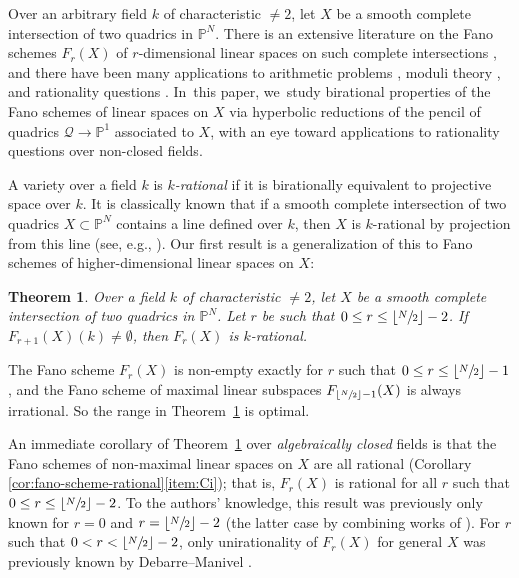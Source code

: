 \documentclass[JEP,XML,SOM,Unicode,NoEqCountersInSection,published]{cedram}
\let\bb\mathbb\let\Bbb\mathbb
\theoremstyle{plain}
\newtheorem{thm}{Theorem}[section]
\theoremstyle{definition}
\newcommand{\defi}[1]{\emph{#1}}
\renewcommand\P{\mathbb{P}}
\begin{document}
Over an arbitrary field $k$ of characteristic $\neq 2$,
let $X$ be a smooth complete intersection of two quadrics in $\P^N$.
There is an extensive literature on
the Fano schemes \(F_r(X)\) of
\(r\)-dimensional linear spaces on such complete intersections
\cite{Gauthier54,Reid-thesis,Tyurin-survey, Donagi80, Wang-maximal-linear-spaces},
and there have been many applications to arithmetic problems \cite{CTSSD, BGW, IP-hyperelliptic, CT-intersection-quadrics}, moduli theory \cite{Desale-Ramanan, Ramanan81}, and rationality questions \cite{ABB14,HT-intersection-quadrics,BW-IJ}. In~this paper, we~study birational properties of
the Fano schemes of linear spaces on $X$ via
hyperbolic reductions of the pencil of quadrics $\mathcal{Q}\to \P^1$ associated to \(X\), with an eye toward applications to rationality questions over non-closed fields.

A variety over a field \(k\) is \defi{\(k\)-rational} if it is birationally equivalent to projective space over \(k\).
It is classically known that if a smooth complete intersection of two quadrics \(X \subset \bb P^N\) contains a line defined over $k$, then $X$ is $k$\nobreakdash-rational by projection from this line (see, e.g., \cite[Prop.\,2.2]{CTSSD}).
Our first result is a generalization of this to Fano schemes of higher-dimensional linear spaces on \(X\):
\begin{thm}\label{Fanoscheme}
Over a field $k$ of characteristic $\neq 2$,
let $X$ be a smooth complete intersection of two quadrics in $\P^N$.
Let $r$ be such that $0\leq r\leq \lfloor \sfrac{N}{2}\rfloor -2$. If~$F_{r+1}(X)(k)\neq \emptyset$,
then $F_r(X)$ is $k$\nobreakdash-rational.
\end{thm}

The Fano scheme \(F_r(X)\) is non-empty exactly for $r$ such that $0\leq r\leq \lfloor \sfrac{N}{2}\rfloor -1$, and the Fano scheme of maximal linear subspaces \(F_{\lfloor \sfrac{N}{2}\rfloor - 1}(X)\) is always irrational. So the range in Theorem~\ref{Fanoscheme} is optimal.

An immediate corollary of Theorem~\ref{Fanoscheme} over \emph{algebraically closed} fields is that the Fano schemes of non-maximal linear spaces on $X$ are all rational (Corollary \ref{cor:fano-scheme-rational}\eqref{item:Ci}); that is, \(F_r(X)\) is rational for all $r$ such that $0\leq r\leq \lfloor \sfrac{N}{2}\rfloor -2$.
To the authors' knowledge, this result was previously only known for \(r=0\) and \(r = \lfloor\sfrac{N}{2}\rfloor-2\) (the latter case by combining works of \cite{Desale-Ramanan,Newstead75,Newstead80,bauer91,casagrande15}).
For $r$ such that $0<r<\lfloor\sfrac{N}{2}\rfloor-2$, only unirationality of $F_r(X)$ for general $X$ was previously known by Debarre--Manivel \cite{DebarreManivel98}.
\end{document}
